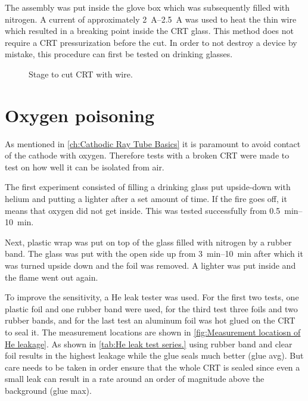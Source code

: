 The assembly was put inside the glove box which was subsequently filled with nitrogen. A current of approximately \SIrange{2}{2.5}{\ampere} was used to heat the thin wire which resulted in a breaking point inside the CRT glass. This method does not require a CRT pressurization before the cut. In order to not destroy a device by mistake, this procedure can first be tested on drinking glasses.

\begin{figure}[ht]
	
	\caption{Stage to cut CRT with wire.}
	\label{fig:Stage to cut CRT with wire}
\end{figure}


\section{Oxygen poisoning}
\label{sec:Oxygen poisoning}


As mentioned in \cref{ch:Cathodic Ray Tube Basics} it is paramount to avoid contact of the cathode with oxygen. Therefore tests with a broken CRT were made to test on how well it can be isolated from air.

The first experiment consisted of filling a drinking glass put upside-down with helium and putting a lighter after a set amount of time. If the fire goes off, it means that oxygen did not get inside. This was tested successfully from \SIrange{0.5}{10}{\minute}.

Next, plastic wrap was put on top of the glass filled with nitrogen by a rubber band. The glass was put with the open side up from \SIrange{3}{10}{\minute} after which it was turned upside down and the foil was removed. A lighter was put inside and the flame went out again.

To improve the sensitivity, a He leak tester was used. For the first two tests, one plastic foil and one rubber band were used, for the third test three foils and two rubber bands, and for the last test an aluminum foil was hot glued on the CRT to seal it. The measurement locations are shown in \cref{fig:Measurement locatiosn of He leakage}. As shown in \cref{tab:He leak test series.} using rubber band and clear foil results in the highest leakage while the glue seals much better (glue avg). But care needs to be taken in order ensure that the whole CRT is sealed since even a small leak can result in a rate around an order of magnitude above the background (glue max).

